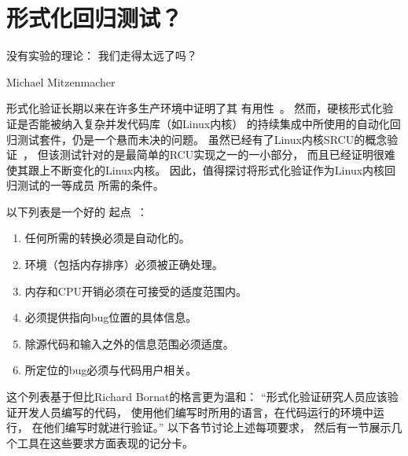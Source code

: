 
\section{形式化回归测试？}
\label{sec:future:Formal Regression Testing?}
%
\epigraph{没有实验的理论：
	  我们走得太远了吗？}
	 {Michael Mitzenmacher}

形式化验证长期以来在许多生产环境中证明了其
有用性~\cite{JamesRLarus2004RightingSoftware,AlBessey2010BillionLoCLater,ByronCook2018FormalAmazon,CaitlinSadowski2018staticAnalysisGoogle,DinoDistefano2019FBstaticAnalysis}。
然而，硬核形式化验证是否能被纳入复杂并发代码库（如Linux内核）
的持续集成中所使用的自动化回归测试套件，仍是一个悬而未决的问题。
虽然已经有了Linux内核SRCU的概念验证~\cite{LanceRoy2017CBMC-SRCU}，
但该测试针对的是最简单的RCU实现之一的一小部分，
而且已经证明很难使其跟上不断变化的Linux内核。
因此，值得探讨将形式化验证作为Linux内核回归测试的一等成员
所需的条件。

以下列表是一个好的
起点~\cite[slide 34]{PaulEMcKenney2015DagstuhlVerification}：

\begin{enumerate}
\item	任何所需的转换必须是自动化的。
\item	环境（包括内存排序）必须被正确处理。
\item	内存和CPU开销必须在可接受的适度范围内。
\item	必须提供指向bug位置的具体信息。
\item	除源代码和输入之外的信息范围必须适度。
\item	所定位的bug必须与代码用户相关。
\end{enumerate}

这个列表基于但比Richard Bornat的格言更为温和：
``形式化验证研究人员应该验证开发人员编写的代码，
使用他们编写时所用的语言，在代码运行的环境中运行，
在他们编写时就进行验证。''
以下各节讨论上述每项要求，
然后有一节展示几个工具在这些要求方面表现的记分卡。

\QuickQuizEnd

